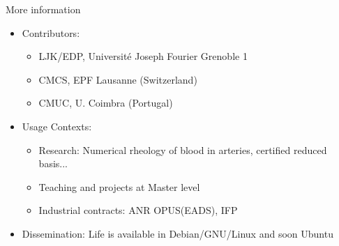\documentclass[final,utf8,,hyperref={pdfpagelabels=false}]{beamer}
\begin{document}
\begin{frame}[containsverbatim]{}
\begin{columns}[t]
      \begin{block}{More information}
        \vspace{-0.5cm}
      \begin{itemize}
      \item Contributors:
        \begin{itemize}
        \item LJK/EDP, Université Joseph Fourier Grenoble 1
        \item CMCS, EPF Lausanne (Switzerland)
        \item CMUC, U. Coimbra (Portugal)
        \end{itemize}
      \item Usage Contexts:
        \begin{itemize}
        \item Research: Numerical rheology of blood in arteries, certified
          reduced basis...
        \item Teaching and projects at Master level
        \item Industrial contracts: ANR OPUS(EADS), IFP
        \end{itemize}
      \item Dissemination: Life is available in Debian/GNU/Linux and soon Ubuntu
      \end{itemize}
    \end{block}

  \end{columns}
  \end{frame}





  
\end{document}
